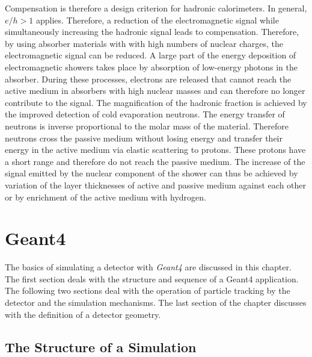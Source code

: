 \documentclass[12pt, a4paper]{thesis}
\begin{document}
Compensation is therefore a design criterion for hadronic
calorimeters. In general, \(e / h > 1\) applies. Therefore, a
reduction of the electromagnetic signal while simultaneously
increasing the hadronic signal leads to compensation. Therefore, by
using absorber materials with with high numbers of nuclear charges,
the electromagnetic signal can be reduced. A large part of the energy
deposition of electromagnetic showers takes place by absorption of
low-energy photons in the absorber. During these processes, electrons are
released that cannot reach the active medium in absorbers with high
nuclear masses and can therefore no longer contribute to the
signal. The magnification of the hadronic fraction is achieved by the
improved detection of cold evaporation neutrons. The energy transfer
of neutrons is inverse proportional to the molar mass of the
material. Therefore neutrons cross the passive medium without losing
energy and transfer their energy in the active medium via elastic
scattering to protons. These protons have a short range and therefore
do not reach the passive medium. The increase of the signal emitted by
the nuclear component of the shower can thus be achieved by variation
of the layer thicknesses of active and passive medium against each
other or by enrichment of the active medium with hydrogen.

\chapter{Geant4}
\label{sec:orgc423253}

The basics of simulating a detector with \emph{Geant4}  \cite{geant_simul_toolk} are discussed in this
chapter. The first section deals with the structure and sequence of a Geant4
application. The following two sections deal with the operation of particle
tracking by the detector and the simulation mechanisms. The last section of the
chapter discusses with the definition of a detector geometry.


\section{The Structure of a Simulation}
\label{sec:org08164e5}
\end{document}
